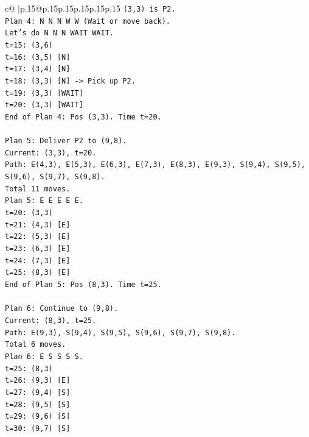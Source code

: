 \documentclass{article}
\begin{document}
{\begin{supertabular}{c@{$\;$}|p{.15\linewidth}@{}p{.15\linewidth}p{.15\linewidth}p{.15\linewidth}p{.15\linewidth}p{.15\linewidth}}
{{{\texttt{(3,3) is P2.} \\
\texttt{Plan 4: N N N W W (Wait or move back).} \\
\texttt{Let's do N N N WAIT WAIT.} \\
\texttt{t=15: (3,6)} \\
\texttt{t=16: (3,5) {[}N{]}} \\
\texttt{t=17: (3,4) {[}N{]}} \\
\texttt{t=18: (3,3) {[}N{]} {-}> Pick up P2.} \\
\texttt{t=19: (3,3) {[}WAIT{]}} \\
\texttt{t=20: (3,3) {[}WAIT{]}} \\
\texttt{End of Plan 4: Pos (3,3). Time t=20.} \\
\\ 
\texttt{Plan 5: Deliver P2 to (9,8).} \\
\texttt{Current: (3,3), t=20.} \\
\texttt{Path: E(4,3), E(5,3), E(6,3), E(7,3), E(8,3), E(9,3), S(9,4), S(9,5), S(9,6), S(9,7), S(9,8).} \\
\texttt{Total 11 moves.} \\
\texttt{Plan 5: E E E E E.} \\
\texttt{t=20: (3,3)} \\
\texttt{t=21: (4,3) {[}E{]}} \\
\texttt{t=22: (5,3) {[}E{]}} \\
\texttt{t=23: (6,3) {[}E{]}} \\
\texttt{t=24: (7,3) {[}E{]}} \\
\texttt{t=25: (8,3) {[}E{]}} \\
\texttt{End of Plan 5: Pos (8,3). Time t=25.} \\
\\ 
\texttt{Plan 6: Continue to (9,8).} \\
\texttt{Current: (8,3), t=25.} \\
\texttt{Path: E(9,3), S(9,4), S(9,5), S(9,6), S(9,7), S(9,8).} \\
\texttt{Total 6 moves.} \\
\texttt{Plan 6: E S S S S.} \\
\texttt{t=25: (8,3)} \\
\texttt{t=26: (9,3) {[}E{]}} \\
\texttt{t=27: (9,4) {[}S{]}} \\
\texttt{t=28: (9,5) {[}S{]}} \\
\texttt{t=29: (9,6) {[}S{]}} \\
\texttt{t=30: (9,7) {[}S{]}} \\
}}}
\end{supertabular}}
\end{document}
